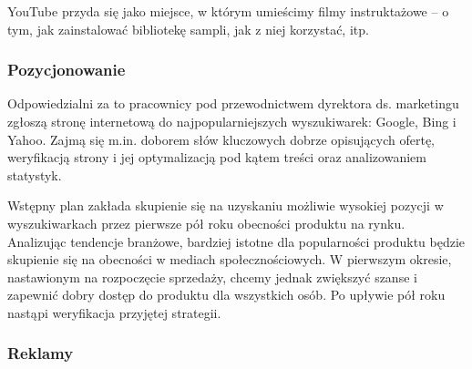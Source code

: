 \documentclass[12pt]{article}
\begin{document}
YouTube przyda się jako miejsce, w którym umieścimy filmy instruktażowe -- o tym, jak zainstalować bibliotekę sampli, jak z niej korzystać, itp.


\subsubsection{Pozycjonowanie}

Odpowiedzialni za to pracownicy pod przewodnictwem dyrektora ds. marketingu zgłoszą stronę internetową do najpopularniejszych wyszukiwarek: Google, Bing i Yahoo.
Zajmą się m.in. doborem słów kluczowych dobrze opisujących ofertę, weryfikacją strony i jej optymalizacją pod kątem treści oraz analizowaniem statystyk.

Wstępny plan zakłada skupienie się na uzyskaniu możliwie wysokiej pozycji w wyszukiwarkach przez pierwsze pół roku obecności produktu na rynku.
Analizując tendencje branżowe, bardziej istotne dla popularności produktu będzie skupienie się na obecności w mediach społecznościowych.
W pierwszym okresie, nastawionym na rozpoczęcie sprzedaży, chcemy jednak zwiększyć szanse i zapewnić dobry dostęp do produktu dla wszystkich osób.
Po upływie pół roku nastąpi weryfikacja przyjętej strategii.


\subsubsection{Reklamy}
\end{document}
